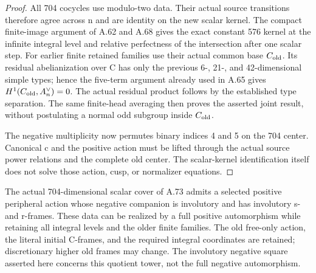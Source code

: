 \begin{proof}
All 704 cocycles use modulo-two data. Their actual source transitions
therefore agree across n and are identity on the new scalar kernel.
The compact finite-image argument of A.62 and A.68 gives the exact
constant 576 kernel at the infinite integral level and relative
perfectness of the intersection after one scalar step.
For earlier finite retained families use their actual common base
\(C_{\rm old}\). Its residual abelianization over C has only the
previous 6-, 21-, and 42-dimensional simple types; hence the five-term
argument already used in A.65 gives
\(H^1(C_{\rm old},A_n^\vee)=0\). The actual residual product follows
by the established type separation. The same finite-head averaging
then proves the asserted joint result, without postulating a normal
odd subgroup inside \(C_{\rm old}\).

The negative multiplicity now permutes binary indices 4 and 5 on the
704 center. Canonical c and the positive action must be lifted through
the actual source power relations and the complete old center.
The scalar-kernel identification itself does not solve those action,
cusp, or normalizer equations.
\end{proof}




The actual 704-dimensional scalar cover of A.73 admits a selected
positive peripheral action whose negative companion is involutory
and has involutory s- and r-frames. These data can be realized by a
full positive automorphism while retaining all integral levels and
the older finite families. The old free-only action, the literal
initial C-frames, and the required integral coordinates are retained;
discretionary higher old frames may change. The involutory negative
square asserted here concerns this quotient tower, not the full
negative automorphism.

